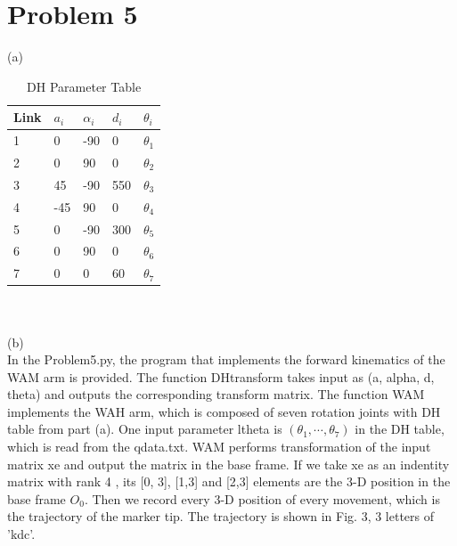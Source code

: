 \documentclass[twoside,11pt]{homework}
\begin{document}
\section*{Problem 5}
(a)\\
%
\begin{table}[h!] \centering
\caption{DH Parameter Table}
\begin{tabular}{|l|l|l|l|l|}
\hline
Link & $a_i$ & $\alpha_i$ & $d_i$ & $\theta_i$ \\ \hline
1             & 0             & -90               & 0    & $\theta_1$    \\ \hline
2             & 0             & 90                & 0    & $\theta_2$    \\ \hline
3             & 45            & -90               & 550  & $\theta_3$    \\ \hline
4             & -45           & 90                & 0    & $\theta_4$    \\ \hline
5             & 0             & -90               & 300  & $\theta_5$    \\ \hline
6             & 0             & 90                & 0    & $\theta_6$    \\ \hline
7             & 0             & 0                 & 60   & $\theta_7$    \\ \hline
\end{tabular}
\end{table}
\\\\
(b)\\
In the Problem5.py, the program that implements the forward kinematics of the WAM arm is provided.
The function DHtransform takes input as (a, alpha, d, theta) and outputs the corresponding transform matrix.
The function WAM implements the WAH arm, which is composed of seven rotation joints with DH table from part (a).
One input parameter ltheta is $(\theta_1, \cdots, \theta_7)$ in the DH table, which is read from the qdata.txt. 
WAM performs transformation of the input matrix xe and output the matrix in the base frame. 
If we take xe as an indentity matrix with rank 4 , its [0, 3], [1,3] and [2,3] elements are the 3-D position in the base frame $O_0$.
Then we record every 3-D position of every movement, which is the trajectory of the marker tip.
The trajectory is shown in Fig. 3, 3 letters of 'kdc'.
%
\end{document}
